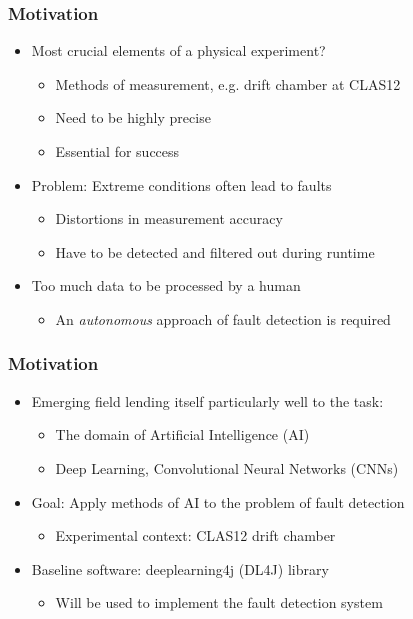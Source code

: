 \begin{frame}
  \frametitle{Motivation}
  \begin{itemize}
    \item Most crucial elements of a physical experiment?
      \begin{itemize}
        \item Methods of measurement, e.g. drift chamber at CLAS12
        \item Need to be highly precise
        \item Essential for success
      \end{itemize}
    \item Problem: Extreme conditions often lead to faults
      \begin{itemize}
        \item Distortions in measurement accuracy
        \item Have to be detected and filtered out during runtime
      \end{itemize}
    \item Too much data to be processed by a human
      \begin{itemize}
        \item An \textit{autonomous} approach of fault detection is required
      \end{itemize}
  \end{itemize}
\end{frame}

\begin{frame}
  \frametitle{Motivation}
  \begin{itemize}
    \item Emerging field lending itself particularly well to the task:
      \begin{itemize}
        \item The domain of Artificial Intelligence (AI)
        \item Deep Learning, Convolutional Neural Networks (CNNs)
      \end{itemize}
    \item Goal: Apply methods of AI to the problem of fault detection
      \begin{itemize}
        \item Experimental context: CLAS12 drift chamber
      \end{itemize}
    \item Baseline software: deeplearning4j (DL4J) library
      \begin{itemize}
        \item Will be used to implement the fault detection system
      \end{itemize}
  \end{itemize}
\end{frame}
